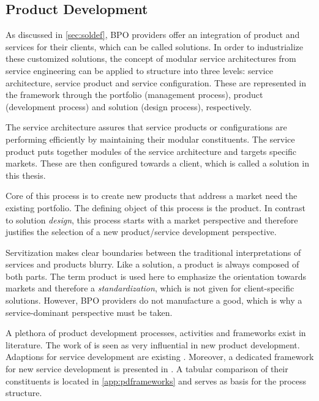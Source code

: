 	\subsection{Product Development}
	\label{sec:proddev}
	
	As discussed in \ref{sec:soldef}, \acrshort{BPO} providers offer an integration of product and services for their clients, which can be called solutions. In order to industrialize these customized solutions, the concept of modular service architectures from service engineering \citep{Bohmann2006} can be applied to structure into three levels: service architecture, service product and service configuration. These are represented in the framework through the portfolio (management process), product (development process) and solution (design process), respectively. 
	
	The service architecture assures that service products or configurations are performing efficiently by maintaining their modular constituents. The service product puts together modules of the service architecture and targets specific markets. These are then configured towards a client, which is called a solution in this thesis. 
	
	Core of this process is to create new products that address a market need \wrt the existing portfolio. The defining object of this process is the product. In contrast to solution \textit{design}, this process starts with a market perspective and therefore justifies the selection of a new product/service development perspective. 
	
	Servitization makes clear boundaries between the traditional interpretations of services and products blurry. Like a solution, a product is always composed of both parts. The term product is used here to emphasize the orientation towards markets and therefore a \textit{standardization}, which is not given for client-specific solutions. However, \acrshort{BPO} providers do not manufacture a good, which is why a service-dominant perspective must be taken.  
	
	A plethora of product development processes, activities and frameworks exist in literature. The work of  \cite{cooper1988new} is seen as very influential in new product development. Adaptions for service development are existing \citep{Edgett_1996}. Moreover, a dedicated framework for new service development is presented in \citep{cowell1988new}. A tabular comparison of their constituents is located in \ref{app:pdframeworks} and serves as basis for the process structure. 
	
